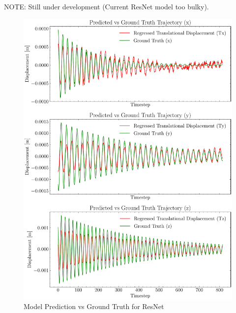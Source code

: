 NOTE: Still under development (Current ResNet model too bulky).

\begin{figure}[H]
    \centering
    \includegraphics[scale=0.6]{images/fig_chapter4/nn_related/predicted_vs_ground_truth_resnet.pdf}
    \caption{Model Prediction vs Ground Truth for ResNet}
    \label{fig:resnet_op_vs_gt}
\end{figure}

